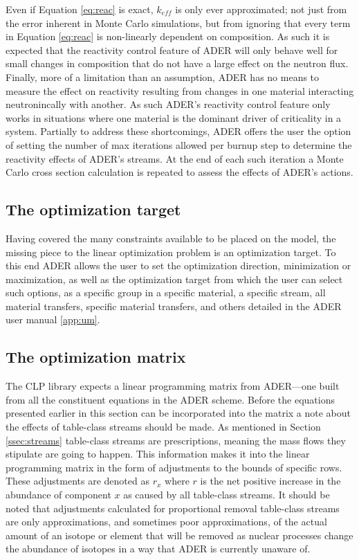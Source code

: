 Even if Equation \ref{eq:reac} is exact, $k_{eff}$ is only ever approximated;
not just from the error inherent in Monte Carlo simulations, but from
ignoring that every term in Equation \ref{eq:reac} is non-linearly dependent
on composition. As such it is expected that the reactivity control feature of
ADER will only behave well for small changes in composition that do not have a
large effect on the neutron flux. Finally, more of a limitation than an
assumption, ADER has no means to measure the effect on reactivity resulting
from changes in one material interacting neutronincally with another. As such 
ADER's reactivity control feature only works in situations where one 
material is the dominant driver of criticality in a system. Partially 
to address these shortcomings, ADER offers the user the option of setting the
number of max iterations allowed per burnup step to determine the reactivity 
effects of
ADER's streams. At the end of each such iteration a Monte Carlo cross section
calculation is repeated to assess the effects of ADER's actions.



\subsection{The optimization target} \label{ssec:opt_target}
Having covered the many constraints available to be placed
on the model, the missing piece to the linear optimization 
problem is an optimization target. To this end ADER allows the user
to set the optimization direction, minimization or maximization, as well as
the optimization target from which the user can select such options, as a
specific group in a specific material, a specific stream, 
all material transfers, specific material transfers, and others detailed in the
ADER user manual \ref{app:um}.


\subsection{The optimization matrix} \label{ssec:opt_matrix}

The CLP library expects a linear programming matrix from ADER---one built from
all the constituent equations in the ADER scheme. Before the equations 
presented earlier in this section can be incorporated into the matrix a note
about the effects of table-class streams should be made. As mentioned in Section
\ref{ssec:streams} table-class streams are prescriptions, meaning the mass 
flows they
stipulate are going to happen. This information makes it into the linear
programming matrix in the form of adjustments to the bounds of specific rows.
These adjustments are denoted
as $r_{x}$ where $r$ is the net positive increase in the abundance of
component $x$ as caused by all table-class streams. It should be noted that
adjustments calculated for proportional removal table-class streams are only
approximations, and sometimes poor approximations, of the actual amount of an
isotope or element that will be removed as nuclear processes change the 
abundance of isotopes in a way that ADER is currently unaware of.


